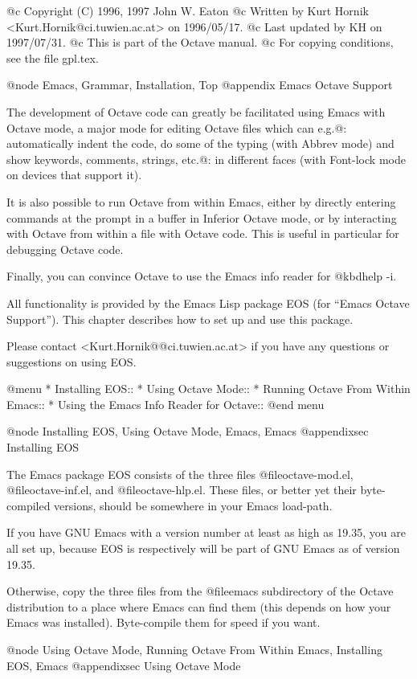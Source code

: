 @c Copyright (C) 1996, 1997 John W. Eaton
@c Written by Kurt Hornik <Kurt.Hornik@ci.tuwien.ac.at> on 1996/05/17.
@c Last updated by KH on 1997/07/31.
@c This is part of the Octave manual.
@c For copying conditions, see the file gpl.tex.

@node Emacs, Grammar, Installation, Top
@appendix Emacs Octave Support

The development of Octave code can greatly be facilitated using Emacs
with Octave mode, a major mode for editing Octave files which can e.g.@:
automatically indent the code, do some of the typing (with Abbrev mode)
and show keywords, comments, strings, etc.@: in different faces (with
Font-lock mode on devices that support it).

It is also possible to run Octave from within Emacs, either by directly
entering commands at the prompt in a buffer in Inferior Octave mode, or
by interacting with Octave from within a file with Octave code.  This is
useful in particular for debugging Octave code.

Finally, you can convince Octave to use the Emacs info reader for
@kbd{help -i}.

All functionality is provided by the Emacs Lisp package EOS (for ``Emacs
Octave Support'').  This chapter describes how to set up and use this
package.

Please contact <Kurt.Hornik@@ci.tuwien.ac.at> if you have any questions
or suggestions on using EOS.

@menu
* Installing EOS::              
* Using Octave Mode::           
* Running Octave From Within Emacs::  
* Using the Emacs Info Reader for Octave::  
@end menu

@node Installing EOS, Using Octave Mode, Emacs, Emacs
@appendixsec Installing EOS

The Emacs package EOS consists of the three files @file{octave-mod.el},
@file{octave-inf.el}, and @file{octave-hlp.el}.  These files, or better
yet their byte-compiled versions, should be somewhere in your Emacs
load-path.

If you have GNU Emacs with a version number at least as high as 19.35,
you are all set up, because EOS is respectively will be part of GNU
Emacs as of version 19.35.

Otherwise, copy the three files from the @file{emacs} subdirectory of
the Octave distribution to a place where Emacs can find them (this
depends on how your Emacs was installed).  Byte-compile them for speed
if you want.

@node Using Octave Mode, Running Octave From Within Emacs, Installing EOS, Emacs
@appendixsec Using Octave Mode

